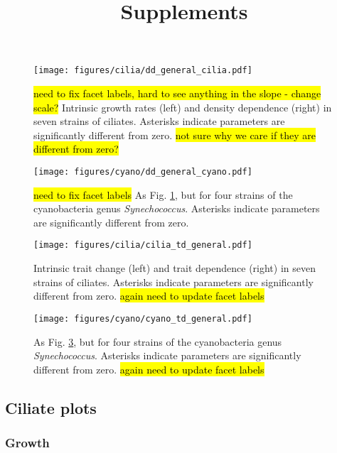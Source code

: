 \title{Supplements}

\maketitle

\begin{figure}
    \centering
    \texttt{[image: figures/cilia/dd\_general\_cilia.pdf]}
    \caption{\hl{need to fix facet labels, hard to see anything in the slope - change scale?} Intrinsic growth rates (left) and density dependence (right) in seven strains of ciliates. Asterisks indicate parameters are significantly different from zero. \hl{not sure why we care if they are different from zero?}}
    \label{fig:dd_general_cilia}
\end{figure}

\begin{figure}
    \centering
    \texttt{[image: figures/cyano/dd\_general\_cyano.pdf]}
    \caption{\hl{need to fix facet labels} As Fig. \ref{fig:dd_general_cilia}, but for four strains of the cyanobacteria genus \emph{Synechococcus}. Asterisks indicate parameters are significantly different from zero.}
    \label{fig:dd_general_cyano}
\end{figure}
\begin{figure}
    \centering
    \texttt{[image: figures/cilia/cilia\_td\_general.pdf]}
    \caption{Intrinsic trait change (left) and trait dependence (right) in seven strains of ciliates. Asterisks indicate parameters are significantly different from zero. \hl{again need to update facet labels}}
    \label{fig:td_general_cilia}
\end{figure}

\begin{figure}
    \centering
    \texttt{[image: figures/cyano/cyano\_td\_general.pdf]}
    \caption{As Fig. \ref{fig:td_general_cilia}, but for four strains of the cyanobacteria genus \emph{Synechococcus}. Asterisks indicate parameters are significantly different from zero. \hl{again need to update facet labels}}
    \label{fig:td_general_cyano}
\end{figure}

\subsection{Ciliate plots}

\subsubsection{Growth}

